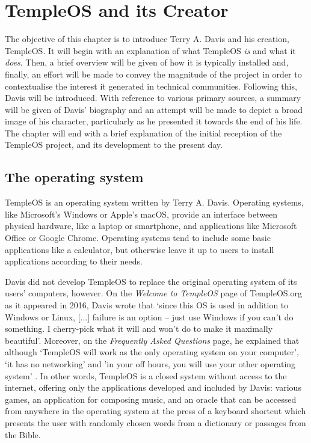 \documentclass[Draft.tex]{subfiles}
\begin{document}
\chapter{TempleOS and its Creator}

The objective of this chapter is to introduce Terry A. Davis
and his creation, TempleOS.
It will begin with an explanation of what TempleOS \textit{is}
and what it \textit{does}.
Then, a brief overview will be given of how it is typically installed
and, finally, an effort will be made to convey
the magnitude of the project in order to contextualise
the interest it generated in technical communities.
Following this, Davis will be introduced.
With reference to various primary sources,
a summary will be given of Davis' biography and
an attempt will be made to depict a broad image of his character,
particularly as he presented it towards the end of his life.
The chapter will end with a brief explanation of the initial reception of
the TempleOS project, and its development to the present day.

\section*{The operating system}

TempleOS is an operating system written by Terry A. Davis.
Operating systems, like Microsoft's Windows or Apple's macOS,
provide an interface between physical hardware, like a laptop or smartphone,
and applications like Microsoft Office or Google Chrome.
Operating systems tend to include some basic applications like a calculator,
but otherwise leave it up to users to install applications
according to their needs.

Davis did not develop TempleOS to replace the original operating system of its
users' computers, however.
On the \textit{Welcome to TempleOS} page of TempleOS.org
as it appeared in 2016\footnotemark, Davis \parencite*{Welcome} wrote that
`since this OS is used in addition to Windows or Linux,
[...] failure is an option -- just use Windows if you can't do something.
I cherry-pick what it will and won't do to make it maximally beautiful'.
Moreover, on the \textit{Frequently Asked Questions} page, he explained that
although `TempleOS will work as the only operating system on your computer',
`it has no networking' and 'in your off hours,
you will use your other operating system' \parencite{FAQ}.
In other words, TempleOS is a closed system without access to the internet,
offering only the applications developed and included by Davis:
various games, an application for composing music,
and an oracle that can be accessed from anywhere in the operating system
at the press of a keyboard shortcut which presents the user with randomly
chosen words from a dictionary or passages from the Bible.
\end{document}
